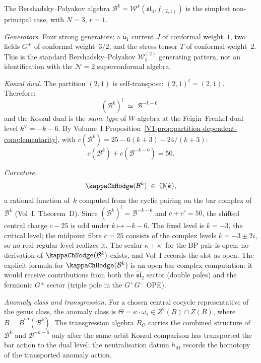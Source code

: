 \begin{computation}
\label{comp:bp-anomaly-completion}
The Bershadsky--Polyakov algebra
$\mathcal B^k=\mathcal W^k(\mathfrak{sl}_3,f_{(2,1)})$
is the simplest non-principal case, with $N=3$, $r=1$.

\emph{Generators.}
Four strong generators: a $\widehat{\mathfrak u}_1$ current \(J\)
of conformal weight~\(1\), two fields \(G^\pm\) of conformal
weight~\(3/2\), and the stress tensor \(T\) of conformal weight~\(2\).
This is the standard Bershadsky--Polyakov
\(\mathcal W^{(2)}_3\) generating pattern, not an identification
with the \(\mathcal N=2\) superconformal algebra.

\emph{Koszul dual.}
The partition $(2,1)$ is self-transpose:
$(2,1)^t=(2,1)$. Therefore:
\[
(\mathcal B^k)^!
\;\simeq\;
\mathcal B^{-k-6},
\]
and the Koszul dual is the \emph{same type} of $W$-algebra
at the Feigin--Frenkel dual level $k^\vee=-k-6$.
By Volume~I
Proposition~\ref*{V1-prop:partition-dependent-complementarity},
with \(c(\mathcal{B}^k)=25-6(k+3)-24/(k+3)\):
\[
c(\mathcal B^k)+c(\mathcal B^{-k-6})=50.
\]

\emph{Curvature.}
\[
\kappaChHodge(\mathcal B^k)
\;\in\;\mathbb Q(k),
\]
a rational function of~$k$ computed from the cyclic pairing
on the bar complex of $\mathcal B^k$ (Vol~I, Theorem~D).
Since $(\mathcal B^k)^!=\mathcal B^{-k-6}$ and
$c+c'=50$, the shifted central charge \(c-25\) is odd under
\(k\mapsto -k-6\).  The fixed level is \(k=-3\), the critical
level; the midpoint fibre \(c=25\) consists of the complex levels
\(k=-3\pm 2i\), so no real regular level realizes it.
The scalar \(\kappa+\kappa^!\) for the BP pair is open: no
derivation of \(\kappaChHodge(\mathcal B^k)\) exists, and Vol~I
records the slot as open.
The explicit formula for $\kappaChHodge(\mathcal B^k)$ is an open
bar-complex computation: it would receive contributions from both
the $\widehat{\mathfrak{sl}}_2$ sector (double poles) and the
fermionic $G^\pm$ sector (triple pole in the $G^+G^-$ OPE).

\emph{Anomaly class and transgression.}
For a chosen central cocycle representative of the genus class, the
anomaly class is
\(\Theta=\kappa\cdot\omega_1\in Z^2(B)\cap Z(B)\),
where $B=\bar B^{\mathrm{ch}}(\mathcal B^k)$. The
transgression algebra $B_\Theta$ carries the combined
structure of $\mathcal B^k$ and $\mathcal B^{-k-6}$ only after the
same-orbit Koszul comparison has transported the bar action to the
dual level; the neutralisation datum \(h_M\) records the homotopy
of the transported anomaly action.


\end{computation}
